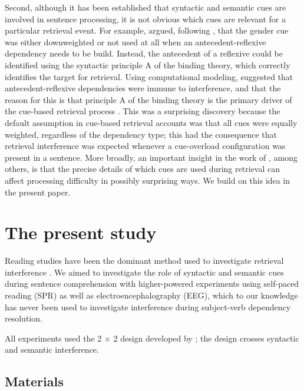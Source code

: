 \documentclass[review,preprint,12pt,authoryear,floatsintext]{elsarticle}
\begin{document}
Second, although it has been established \citep[e.g.,][]{vandyke07,mertzen} that syntactic and semantic cues are involved in sentence processing, it is not obvious which cues are relevant for a particular retrieval event. For example, \cite{dillon2013} argued, following \cite{Sturt2003}, that the gender cue was either downweighted or not used at all when an antecedent-reflexive dependency needs to be build. Instead, the antecedent of a reflexive could be identified using the syntactic principle A of the binding theory, which correctly identifies the target for retrieval.  Using computational modeling, \cite{dillon2013} suggested that antecedent-reflexive dependencies were immune to interference, and that the reason for this is that principle A of the binding theory is the primary driver of the cue-based retrieval process \citep[cf. ][]{jaeger_etal_2020,yadav2021individual}. This was a surprising discovery because the default assumption in cue-based retrieval accounts was that all cues were equally weighted, regardless of the dependency type; this had the consequence that retrieval interference was expected whenever a cue-overload configuration was present in a sentence. More broadly, an important insight in the work of \cite{dillon2013}, among others, is that  the precise details of which cues are used during retrieval can affect processing difficulty in possibly surprising ways. We build on this idea in the present paper.

\section*{The present study}

Reading studies have been the dominant method used to investigate retrieval interference \citep[see the review in][]{jaeger_etal_2017}. We aimed to investigate the role of syntactic and semantic cues during sentence comprehension with higher-powered experiments using  self-paced reading (SPR) as well as electroencephalography (EEG), which to our knowledge has never been used to investigate interference during subject-verb dependency resolution.

{All experiments used the 2 $\times$ 2 design developed by \cite{vandyke07}; the design crosses syntactic and semantic interference.} \label{vd_design}

\subsection*{Materials}
\end{document}
